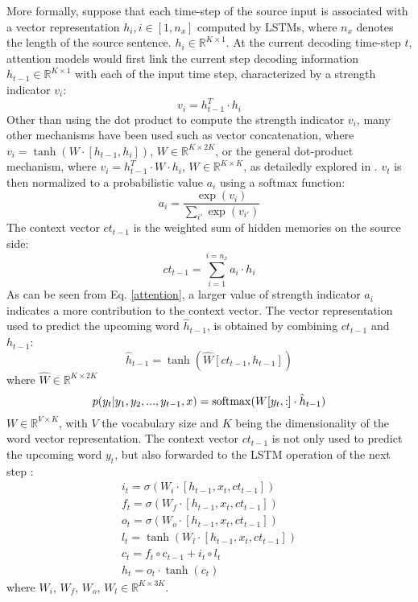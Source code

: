 More formally, suppose that each time-step of the source input is associated with a vector representation $h_{i}, i\in [1,n_x]$ computed by LSTMs, where $n_x$ denotes the length of the source sentence. 
$h_{i} \in \mathbb{R}^{K\times 1}$.
At the current decoding time-step $t$, attention models would first link the current step
decoding information $h_{t-1}\in \mathbb{R}^{K\times 1}$ with each of the input time step,  characterized by a
strength indicator $v_i$:
\begin{equation}
v_i=h_{t-1}^T\cdot h_{i}
\end{equation}
Other than using the dot product to compute the strength indicator $v_i$, many other mechanisms have been used such as vector concatenation, where $v_i=\tanh(W\cdot [h_{t-1}, h_i])$, $W \in \mathbb{R}^{K\times 2K}$,
or the general dot-product mechanism, where  $v_i=h_{t-1}^T\cdot W\cdot h_{i}$, 
$W \in \mathbb{R}^{K\times K}$,
as detailedly explored in \cite{luong2015effective}. 
$v_t$ is then normalized to a probabilistic value $a_i$ using a softmax function:
\begin{equation}
a_i=\frac{\exp{(v_i)}}{\sum_{i'}\exp(v_{i'})}
\end{equation}
The context vector $ct_{t-1}$ is the weighted sum of hidden memories on the source side:
\begin{equation}
ct_{t-1}=\sum_{i=1}^{i=n_x} a_i\cdot h_{i}
\label{attention}
\end{equation}
As can be seen from Eq. \ref{attention}, a larger value of strength indicator $a_i$ indicates a more contribution to the context vector. 
The vector representation used to predict the upcoming word  $\hat{h}_{t-1}$,  is obtained by combining $ct_{t-1}$ and $h_{t-1}$:
\begin{equation}
\hat{h}_{t-1}=\tanh (\hat{W}[ct_{t-1},h_{t-1}])
\end{equation}
where $\hat{W} \in \mathbb{R}^{K\times 2K}$
\begin{equation}
p(y_t|y_1,y_2,...,y_{t-1},x)=\operatorname{softmax}(W [y_t, :]\cdot \hat{h}_{t-1})
\end{equation}
$W \in \mathbb{R}^{V\times K}$, with $V$ the vocabulary size and $K$ being the dimensionality of the word vector representation.
The context vector $ct_{t-1}$ is not only used to predict the upcoming word $y_t$, but also forwarded to the LSTM operation of the next step \cite{luong2015effective}: 
\begin{eqnarray}
i_t=\sigma (W_i\cdot [h_{t-1},x_t,ct_{t-1}])\\
f_t=\sigma (W_f\cdot [h_{t-1},x_t,ct_{t-1}])\\
o_t=\sigma (W_o\cdot [h_{t-1},x_t,ct_{t-1}])\\
l_t=\tanh(W_l\cdot [h_{t-1},x_t,ct_{t-1}])\\
c_t=f_t\circ c_{t-1}+i_t\circ l_t\\
h_{t}=o_t\cdot \tanh(c_t)
\end{eqnarray}
where $W_i$, $W_f$, $W_o$, $W_l \in \mathbb{R}^{K\times 3K}$.

